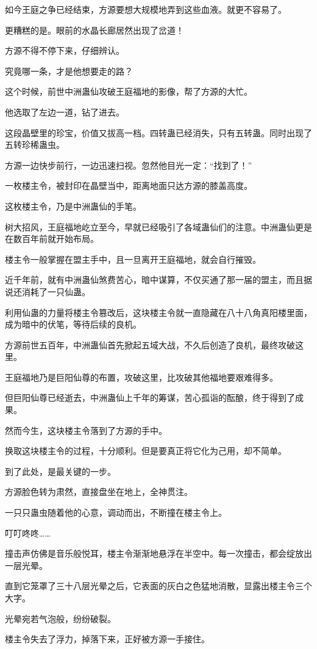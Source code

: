 \begin{this_body}
如今王庭之争已经结束，方源要想大规模地弄到这些血液。就更不容易了。

更糟糕的是。眼前的水晶长廊居然出现了岔道！

方源不得不停下来，仔细辨认。

究竟哪一条，才是他想要走的路？

这个时候，前世中洲蛊仙攻破王庭福地的影像，帮了方源的大忙。

他选取了左边一道，钻了进去。

这段晶壁里的珍宝，价值又拔高一档。四转蛊已经消失，只有五转蛊。同时出现了五转珍稀蛊虫。

方源一边快步前行，一边迅速扫视。忽然他目光一定：“找到了！”

一枚楼主令，被封印在晶壁当中，距离地面只达方源的膝盖高度。

这枚楼主令，乃是中洲蛊仙的手笔。

树大招风，王庭福地屹立至今，早就已经吸引了各域蛊仙们的注意。中洲蛊仙更是在数百年前就开始布局。

楼主令一般掌握在盟主手中，且一旦离开王庭福地，就会自行摧毁。

近千年前，就有中洲蛊仙煞费苦心，暗中谋算，不仅买通了那一届的盟主，而且据说还消耗了一只仙蛊。

利用仙蛊的力量将楼主令篡改后，这块楼主令就一直隐藏在八十八角真阳楼里面，成为暗中的伏笔，等待后续的良机。

方源前世五百年，中洲蛊仙首先掀起五域大战，不久后创造了良机，最终攻破这里。

王庭福地乃是巨阳仙尊的布置，攻破这里，比攻破其他福地要艰难得多。

但巨阳仙尊已经逝去，中洲蛊仙上千年的筹谋，苦心孤诣的酝酿，终于得到了成果。

然而今生，这块楼主令落到了方源的手中。

换取这块楼主令的过程，十分顺利。但是要真正将它化为己用，却不简单。

到了此处，是最关键的一步。

方源脸色转为肃然，直接盘坐在地上，全神贯注。

一只只蛊虫随着他的心意，调动而出，不断撞在楼主令上。

叮叮咚咚……

撞击声仿佛是音乐般悦耳，楼主令渐渐地悬浮在半空中。每一次撞击，都会绽放出一层光晕。

直到它笼罩了三十八层光晕之后，它表面的灰白之色猛地消散，显露出楼主令三个大字。

光晕宛若气泡般，纷纷破裂。

楼主令失去了浮力，掉落下来，正好被方源一手接住。


\end{this_body}
